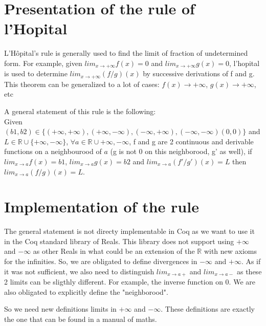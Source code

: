 \documentclass[11pt]{article}
\begin{document}
\section{Presentation of the rule of l'Hopital}

L'Hôpital's rule is generally used to find the limit of fraction of undetermined form.
For example, given $lim_{x \rightarrow +\infty} f(x) = 0$ and $lim_{x \rightarrow +\infty} g(x) = 0$, l'hopital is used to determine $lim_{x \rightarrow +\infty} (f /g) (x)$ by successive derivations of f and g.
This theorem can be generalized to a lot of cases:  $f(x) \rightarrow +\infty$, $g(x) \rightarrow +\infty$, etc

A general statement of this rule is the following:\\
Given $(b1, b2) \in \{(+\infty, +\infty), (+\infty, - \infty), (- \infty, +\infty), (- \infty, -\infty) (0, 0)\}$ and $L \in \mathbb{R} \cup \{+\infty, -\infty\}$, 
$\forall a \in \mathbb{R} \cup {+\infty, -\infty}$, f and g are 2 continuous and derivable functions on a neighbourood of $a$ (g is not 0 on this neighborood, g' as well), 
if $lim_{x \rightarrow a} f (x) = b1$, $lim_{x \rightarrow a} g (x) = b2$ and $lim_{x \rightarrow a} (f'/g') (x) = L$  then  $lim_{x \rightarrow a} (f/g) (x) = L$.\\





\section{Implementation of the rule}

The general statement is not directy implementable in Coq as we want to use it in the Coq standard library of Reals. This library does not support using $+\infty$ and $-\infty$
as other Reals in what could be an extension of the $\mathbb{R}$ with new axioms for the infinities. So, we are obligated to define divergences in
$-\infty$ and $+\infty$.
As if it was not sufficient, we also need to distinguish $lim_{x \rightarrow a+}$ and $lim_{x \rightarrow a-}$ as these 2 limits can be sligthly different. For example, the inverse function
on 0.
We are also obligated to explicitly define the "neighborood".

So we need new definitions limits in $+\infty$ and $-\infty$. These definitions are exactly the one that can be found in a manual of maths. %
\end{document}
